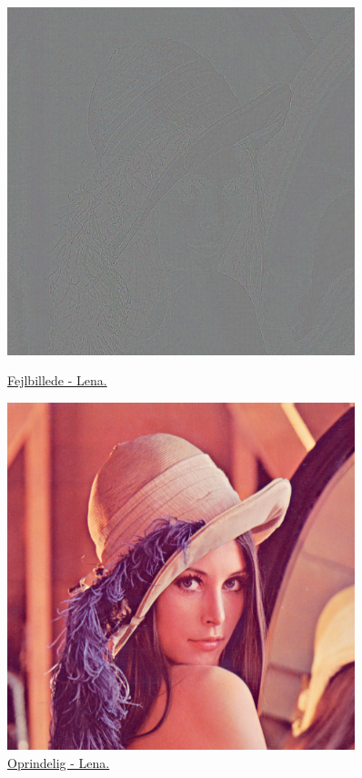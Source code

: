 \begin{figure}[htbp]
\begin{minipage}{0.3\textwidth}
\includegraphics[width=0.9\textwidth]{Billeder/fejlbilleder/fejl50.png}
\caption{\href{https://www.dropbox.com/home/P1\%20-\%20B205/vejleder/billeder/DCT/Fejlbilleder?preview=fejl50.png}{Fejlbillede - Lena.}}
\label{fig:lena1-org-fejl}
\end{minipage}
\hspace{0.5cm}
\begin{minipage}{0.3\textwidth}
\centering
\includegraphics[width=0.9\textwidth]{Billeder/LenaAnvendelse/LENABILLEDE/lena1-org.png}
\caption{\href{https://www.dropbox.com/home/P1\%20-\%20B205/vejleder/billeder?preview=lena-org.tiff}{Oprindelig - Lena.}}
\label{fig:lena1-org-visuel}
\end{minipage}
\end{figure}
